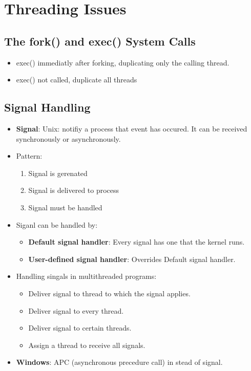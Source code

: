 \documentclass[10pt]{report}
\begin{document}
	\section{Threading Issues}
		\subsection{The fork() and exec() System Calls}
			\begin{itemize}
				\item exec() immediatly after forking, duplicating only the calling thread.
				\item exec() not called, duplicate all threads
			\end{itemize}

		\subsection{Signal Handling}
			\begin{itemize}
				\item \textbf{Signal}: Unix: notifiy a process that event has occured. It can be received synchronously or asynchronously.
				\item Pattern:
				\begin{enumerate}
					\item Signal is gerenated
					\item Signal is delivered to process
					\item Signal must be handled
				\end{enumerate}
				\item Siganl can be handled by:
				\begin{itemize}
					\item \textbf{Default signal handler}: Every signal has one that the kernel runs.
					\item \textbf{User-defined signal handler}: Overrides Default signal handler.
				\end{itemize}
				\item Handling singals in multithreaded programs:
				\begin{itemize}
					\item Deliver signal to thread to which the signal applies.
					\item Deliver signal to every thread.
					\item Deliver signal to certain threads.
					\item Assign a thread to receive all signals.
				\end{itemize}
				\item \textbf{Windows}: APC (asynchronous precedure call) in stead of signal.
			\end{itemize}
\end{document}

